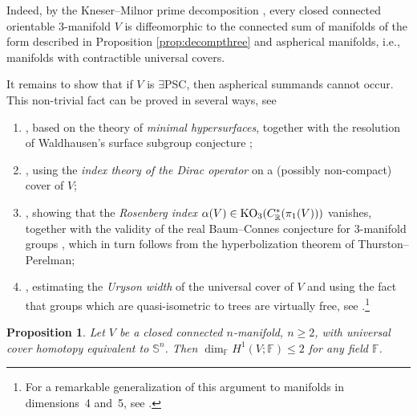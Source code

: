 \documentclass[pdftex]{sigma}
\numberwithin{equation}{section}
\newtheorem{Proposition}[Theorem]{Proposition}
\newcommand{\F}{\mathbb{F}}
\newcommand{\R}{\mathbb{R}}
\newcommand{\SSS}{\mathbb{S}}
\newcommand{\myicon}{$\,\,\,\triangleright$}
\newcommand{\yes}{{\color {blue!70!black}$\exists$}{\sf PSC}}
\begin{document}
Indeed, by the Kneser--Milnor prime decomposition \cite{Milnor1962}, every closed connected orientable $3$-manifold $V$ is diffeomorphic to the connected sum of manifolds of the form described in Proposition \ref{prop:decompthree} and aspherical manifolds, i.e., manifolds with contractible universal covers.

It remains to show that if $V$ is \yes, then aspherical summands cannot occur.
This non-trivial fact can be proved in several ways, see
\begin{enumerate}[\myicon]\itemsep=0pt
 \item \cite[Theorem 5.2]{S-Y1979}, based on the theory of {\em minimal hypersurfaces}, together with the resolution of Waldhausen's surface subgroup conjecture \cite{K-M2012};
\item \cite[Theorem 8.1]{G-L1983}, using the {\em index theory of the Dirac operator} on a (possibly non-compact) cover of $V$;
\item \cite[Theorem 3.4]{Ros1986}, showing that the {\em Rosenberg index} $\alpha(V) \in {\rm KO}_3(C^*_{\R} (\pi_1(V)))$ vanishes, together with the validity of the real Baum--Connes conjecture for $3$-manifold groups \cite{MOP08}, which in turn follows from the hyperbolization theorem of Thurston--Perelman;
\item \cite[Corollary 3.10.1\,(F$''$)]{Gr21}, estimating the {\em Uryson width} of the universal cover of $V$ and using the fact that groups which are quasi-isometric to trees are virtually free, see \cite[Theorem~7.19]{GdlH}.\footnote{For a remarkable generalization of this argument to manifolds in dimensions~4 and~5, see \cite{Ch-Li}.}
\end{enumerate}

\begin{Proposition} \label{ranks}
Let $V$ be a closed connected $n$-manifold, $n \geq 2$, with universal cover homotopy equivalent to $\SSS^n$.
Then $\dim_{\F} H^1 (V; \F) \leq 2$ for any field $\F$.
\end{Proposition}
\end{document}

